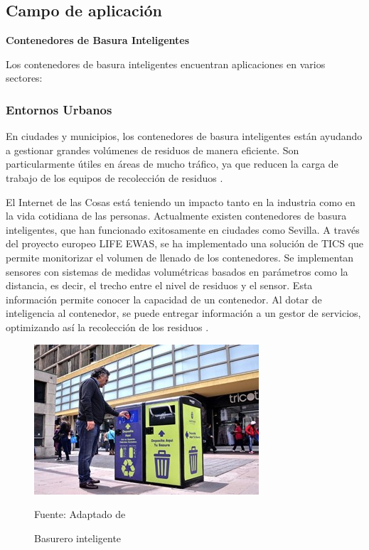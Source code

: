 \subsection{Campo de aplicación}

\textbf{Contenedores de Basura Inteligentes}

Los contenedores de basura inteligentes encuentran aplicaciones en varios sectores:

\subsubsection{Entornos Urbanos}
En ciudades y municipios, los contenedores de basura inteligentes están ayudando a gestionar grandes volúmenes de residuos de manera eficiente. Son particularmente útiles en áreas de mucho tráfico, ya que reducen la carga de trabajo de los equipos de recolección de residuos \cite{buying}.

El Internet de las Cosas está teniendo un impacto tanto en la industria como en la vida cotidiana de las personas. Actualmente existen contenedores de basura inteligentes, que han funcionado exitosamente en ciudades como Sevilla. A través del proyecto europeo LIFE EWAS, se ha implementado una solución de TICS que permite monitorizar el volumen de llenado de los contenedores. Se implementan sensores con sistemas de medidas volumétricas basados en parámetros como la distancia, es decir, el trecho entre el nivel de residuos y el sensor. Esta información permite conocer la capacidad de un contenedor. Al dotar de inteligencia al contenedor, se puede entregar información a un gestor de servicios, optimizando así la recolección de los residuos \cite{quimbita}.

\begin{figure}[htb]
	\centering
	\includegraphics[scale  = 0.90]{Imagenes/basurero int.jpg}
	\caption{Basurero inteligente}{Fuente: Adaptado de~\cite{chile}}

\end{figure}

